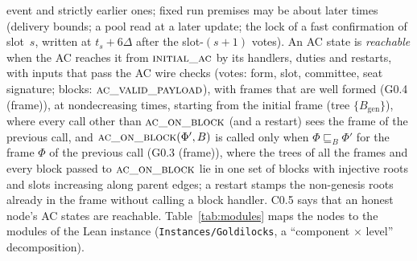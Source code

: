 \documentclass{article}
\newcommand{\genesis}{B_{\mathrm{gen}}}
\newcommand{\Fr}{\Phi}
\newcommand{\fname}[1]{\text{\textsc{#1}}}
\begin{document}
event and strictly earlier ones; fixed run premises may be about later times
(delivery bounds; a pool read at a later update; the lock of a fast
confirmation of slot~$s$, written at $t_s+6\Delta$ after the slot-$(s+1)$
votes).  An AC state is \emph{reachable} when the AC
reaches it from $\fname{initial\_ac}$ by its handlers, duties and restarts, with
inputs that pass the AC wire checks (votes: form, slot, committee, seat
signature; blocks: $\fname{ac\_valid\_payload}$), with frames that are well
formed (G0.4 (frame)), at nondecreasing times, starting from the initial frame
(tree $\{\genesis\}$), where every call other than $\fname{ac\_on\_block}$
(and a restart) sees the frame of the previous call, and
$\fname{ac\_on\_block}(\Fr',B)$ is called only when $\Fr\sqsubseteq_B\Fr'$ for
the frame $\Fr$ of the previous call (G0.3 (frame)), where the trees of all
the frames and every block passed to $\fname{ac\_on\_block}$ lie in one set of
blocks with injective roots and slots increasing along parent edges; a restart
stamps the non-genesis roots already in the frame without calling a block handler.
C0.5 says that an honest node's
AC states are reachable.  Table~\ref{tab:modules} maps the
nodes to the modules of the Lean instance (\texttt{Instances/Goldilocks}, a
``component $\times$ level'' decomposition).
\end{document}
